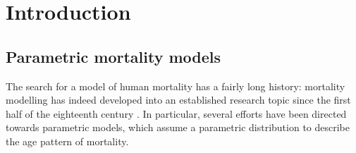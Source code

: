 \documentclass[Thesis]{subfiles}
\begin{document}
\newpage


\normalsize

\section{Introduction}
\label{Sec:Ch2sec1}

\subsection{Parametric mortality models}
\label{Subsec:Ch2subsec1.1}

The search for a model of human mortality has a fairly long history: mortality modelling has indeed developed into an established research topic since the first half of the eighteenth century \citep{tabeau2001review}. In particular, several efforts have been directed towards parametric models, which assume a parametric distribution to describe the age pattern of mortality.
\end{document}
